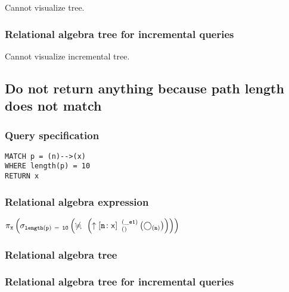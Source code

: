 Cannot visualize tree.

\subsubsection*{Relational algebra tree for incremental queries}

Cannot visualize incremental tree.

\subsection{Do not return anything because path length does not match}

\subsubsection*{Query specification}

\begin{lstlisting}
MATCH p = (n)-->(x)
WHERE length(p) = 10
RETURN x
\end{lstlisting}

\subsubsection*{Relational algebra expression}

$\projection{\var{x}} \left(\selection{\mathtt{length(p)~=~10}} \left(\alldifferent{} \left(\expandout{n}{x}{}{\_e1}{} \left(\getvertices{n}{}\right)\right)\right)\right)$

\subsubsection*{Relational algebra tree}


\subsubsection*{Relational algebra tree for incremental queries}

